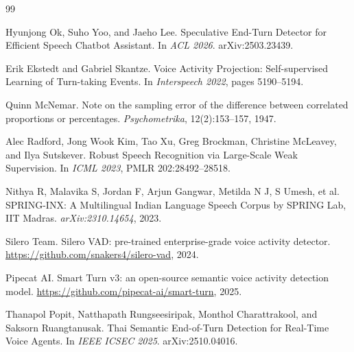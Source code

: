 \documentclass[11pt]{article}
\begin{document}
\begin{thebibliography}{99}
\small

Hyunjong Ok, Suho Yoo, and Jaeho Lee.
\newblock Speculative End-Turn Detector for Efficient Speech Chatbot Assistant.
\newblock In \emph{ACL 2026}. arXiv:2503.23439.

Erik Ekstedt and Gabriel Skantze.
\newblock Voice Activity Projection: Self-supervised Learning of Turn-taking
Events.
\newblock In \emph{Interspeech 2022}, pages 5190--5194.

Quinn McNemar.
\newblock Note on the sampling error of the difference between correlated
proportions or percentages.
\newblock \emph{Psychometrika}, 12(2):153--157, 1947.

Alec Radford, Jong Wook Kim, Tao Xu, Greg Brockman, Christine McLeavey, and
Ilya Sutskever.
\newblock Robust Speech Recognition via Large-Scale Weak Supervision.
\newblock In \emph{ICML 2023}, PMLR 202:28492--28518.

Nithya R, Malavika S, Jordan F, Arjun Gangwar, Metilda N J, S Umesh, et al.
\newblock SPRING-INX: A Multilingual Indian Language Speech Corpus by SPRING
Lab, IIT Madras.
\newblock \emph{arXiv:2310.14654}, 2023.

Silero Team.
\newblock Silero VAD: pre-trained enterprise-grade voice activity detector.
\newblock \url{https://github.com/snakers4/silero-vad}, 2024.

Pipecat AI.
\newblock Smart Turn v3: an open-source semantic voice activity detection model.
\newblock \url{https://github.com/pipecat-ai/smart-turn}, 2025.

Thanapol Popit, Natthapath Rungseesiripak, Monthol Charattrakool, and Saksorn
Ruangtanusak.
\newblock Thai Semantic End-of-Turn Detection for Real-Time Voice Agents.
\newblock In \emph{IEEE ICSEC 2025}. arXiv:2510.04016.

\end{thebibliography}
\end{document}
